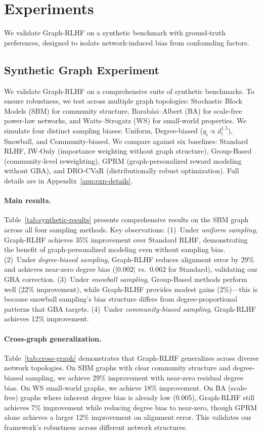 \documentclass{article}
\theoremstyle{plain}
\theoremstyle{definition}
\theoremstyle{remark}
\begin{document}
\section{Experiments}
\label{sec:experiments}

We validate Graph-RLHF on a synthetic benchmark with ground-truth preferences,
designed to isolate network-induced bias from confounding factors.

\subsection{Synthetic Graph Experiment}
\label{subsec:exp-synthetic}

We validate Graph-RLHF on a comprehensive suite of synthetic benchmarks. To ensure robustness, we test across multiple graph topologies: Stochastic Block Models (SBM) for community structure, Barabási–Albert (BA) for scale-free power-law networks, and Watts–Strogatz (WS) for small-world properties.
We simulate four distinct sampling biases: Uniform, Degree-biased ($q_i \propto d_i^{1.5}$), Snowball, and Community-biased. We compare against six baselines: Standard RLHF, IW-Only (importance weighting without graph structure), Group-Based (community-level reweighting), GPRM (graph-personalized reward modeling without GBA), and DRO-CVaR (distributionally robust optimization). Full details are in Appendix~\ref{app:exp-details}.

\paragraph{Main results.}
Table~\ref{tab:synthetic-results} presents comprehensive results on the SBM graph across all four sampling methods. Key observations: (1)~Under \textit{uniform sampling}, Graph-RLHF achieves 35\% improvement over Standard RLHF, demonstrating the benefit of graph-personalized modeling even without sampling bias. (2)~Under \textit{degree-biased sampling}, Graph-RLHF reduces alignment error by 29\% and achieves near-zero degree bias ($|0.002|$ vs.~$0.062$ for Standard), validating our GBA correction. (3)~Under \textit{snowball sampling}, Group-Based methods perform well (22\% improvement), while Graph-RLHF provides modest gains (2\%)---this is because snowball sampling's bias structure differs from degree-proportional patterns that GBA targets. (4)~Under \textit{community-biased sampling}, Graph-RLHF achieves 12\% improvement.

\paragraph{Cross-graph generalization.}
Table~\ref{tab:cross-graph} demonstrates that Graph-RLHF generalizes across diverse network topologies. On SBM graphs with clear community structure and degree-biased sampling, we achieve 29\% improvement with near-zero residual degree bias. On WS small-world graphs, we achieve 18\% improvement. On BA (scale-free) graphs where inherent degree bias is already low ($0.005$), Graph-RLHF still achieves 7\% improvement while reducing degree bias to near-zero, though GPRM alone achieves a larger 12\% improvement on alignment error. This validates our framework's robustness across different network structures.
\end{document}
